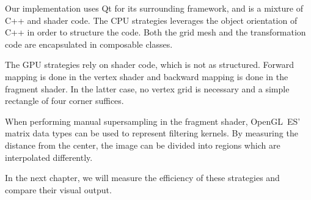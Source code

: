 \documentclass[english,12pt]{ifimaster}
\DeclareMathOperator{\atantwo}{atan2}
\begin{document}
Our implementation uses Qt for its surrounding framework, and is a
mixture of C++ and shader code. The CPU strategies leverages the
object orientation of C++ in order to structure the code. Both the
grid mesh and the transformation code are encapsulated in composable
classes.

The GPU strategies rely on shader code, which is not as structured.
Forward mapping is done in the vertex shader and backward mapping is
done in the fragment shader. In the latter case, no vertex grid is
necessary and a simple rectangle of four corner suffices.

When performing manual supersampling in the fragment shader,
OpenGL~ES' matrix data types can be used to represent filtering
kernels. By measuring the distance from the center, the image can be
divided into regions which are interpolated differently.

In the next chapter, we will measure the efficiency of these
strategies and compare their visual output.



\end{document}
